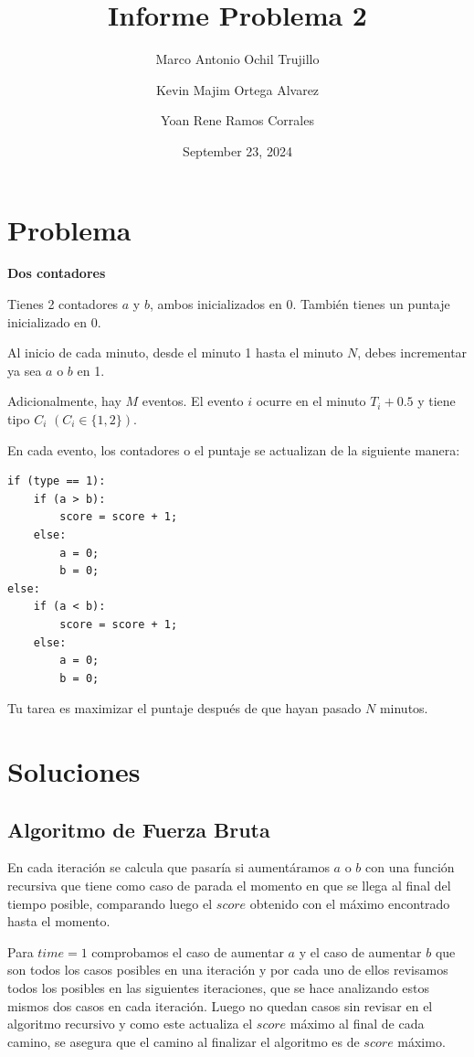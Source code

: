 \documentclass[12pt,a4paper]{report}
\title{Informe Problema 2}
\author{
    Marco Antonio Ochil Trujillo \\
    \and
    Kevin Majim Ortega Alvarez \\
    \and
    Yoan Rene Ramos Corrales \\
}
\date{September 23, 2024}
\begin{document}
\maketitle

\tableofcontents

\chapter{Problema}

\textbf{Dos contadores}

Tienes 2 contadores $a$ y $b$, ambos inicializados en 0. También tienes un puntaje inicializado en 0.

Al inicio de cada minuto, desde el minuto 1 hasta el minuto $N$, debes incrementar ya sea $a$ o $b$ en 1.

Adicionalmente, hay $M$ eventos. El evento $i$ ocurre en el minuto $T_i + 0.5$ y tiene tipo $C_i$ $(C_i \in \{1, 2\})$.

En cada evento, los contadores o el puntaje se actualizan de la siguiente manera:

\begin{lstlisting}
if (type == 1):
    if (a > b):
        score = score + 1;
    else:
        a = 0;
        b = 0;
else:
    if (a < b):
        score = score + 1;
    else:
        a = 0;
        b = 0;
\end{lstlisting}

Tu tarea es maximizar el puntaje después de que hayan pasado $N$ minutos.

\chapter{Soluciones}

\section{Algoritmo de Fuerza Bruta}

En cada iteración se calcula que pasaría si aumentáramos $a$ o $b$ con una función recursiva que tiene como caso de parada el momento en que se llega al final del tiempo posible, comparando luego el $score$ obtenido con el máximo encontrado hasta el momento.

Para $time = 1$ comprobamos el caso de aumentar $a$ y el caso de aumentar $b$ que son todos los casos posibles en una iteración y por cada uno de ellos revisamos todos los posibles en las siguientes iteraciones, que se hace analizando estos mismos dos casos en cada iteración. Luego no quedan casos sin revisar en el algoritmo recursivo y como este actualiza el $score$ máximo al final de cada camino, se asegura que el camino al finalizar el algoritmo es de $score$ máximo.
\end{document}
